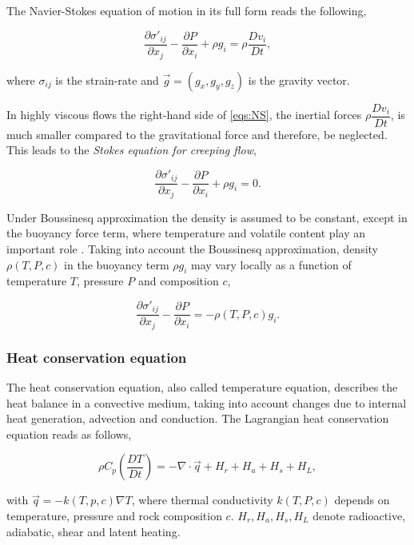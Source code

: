 The Navier-Stokes equation of motion in its full form reads the following,

\begin{equation}\label{eqs:NS}
\dfrac{\partial \sigma'_{ij}}{\partial x_j} - \dfrac{\partial P}{\partial x_i} + \rho g_i = \rho \dfrac{D v_i}{D t},
\end{equation}

where $\sigma_{ij}$ is the strain-rate and $\vec{g} = \left(g_x,g_y,g_z\right)$ is the gravity vector.

In highly viscous flows the right-hand side of \eqref{eqs:NS}, the inertial forces $\rho \dfrac{D v_i}{D t}$, is much smaller compared to the gravitational force and therefore, be neglected. This leads to the \textit{Stokes equation for creeping flow},

\begin{equation}\label{eqs:Stokes}
\dfrac{\partial \sigma'_{ij}}{\partial x_j} - \dfrac{\partial P}{\partial x_i} + \rho g_i = 0.
\end{equation}

Under Boussinesq approximation the density is assumed to be constant, except in the buoyancy force term, where temperature and volatile content play an important role \citep{Gerya2003}. Taking into account the Boussinesq approximation, density $\rho(T, P, c)$ in the buoyancy term $\rho g_i$ may vary locally as a function of temperature $T$, pressure $P$ and composition $c$,

\begin{equation}\label{eqs:Boussinesq}
\dfrac{\partial \sigma'_{ij}}{\partial x_j} - \dfrac{\partial P}{\partial x_i} = - \rho(T, P, c) g_i.
\end{equation}

\subsubsection{Heat conservation equation}

The heat conservation equation, also called temperature equation, describes the heat balance in a convective medium, taking into account changes due to internal heat generation, advection and conduction. The Lagrangian heat conservation equation reads as follows,

\begin{equation}
\rho C_p \left(\dfrac{D T}{D t}\right) = - \nabla \cdot \vec{q} + H_r + H_a + H_s + H_L,
\end{equation}

with $\vec{q} = -k(T, p, c) \nabla T$, where thermal conductivity $k(T, P, c)$ depends on temperature, pressure and rock composition $c$. $H_r, H_a, H_s, H_L$ denote radioactive, adiabatic, shear and latent heating.


